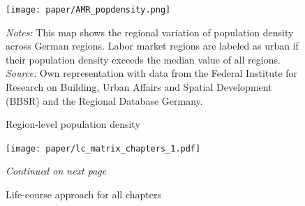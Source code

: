 \documentclass[11pt, a4paper, draft]{article} %
\begin{document}
\vspace*{\fill}
\begin{figure}[H]\centering
	\caption{Region-level population density}\label{fig: AMR_regions_population_density}
	\texttt{[image: paper/AMR\_popdensity.png]}
	\scriptsize
	\begin{minipage}{0.9\linewidth}
		\emph{Notes:} This map shows the regional variation of population density across German regions. Labor market regions are labeled as urban if their population density exceeds the median value of all regions. \newline\emph{Source:} Own representation with data from the Federal Institute for Research on Building, Urban Affairs and Spatial Development (BBSR) and the Regional Database Germany.
	\end{minipage}
\end{figure}
\vspace*{\fill}\clearpage


\begin{figure}[H]\centering
	\caption{Life-course approach for all chapters}\label{fig: appendix_lc_matrix_chapters}
	\texttt{[image: paper/lc\_matrix\_chapters\_1.pdf]}
		\scriptsize
		\begin{minipage}{\linewidth}
			\emph{Continued on next page}
		\end{minipage}
\end{figure}
\end{document}
